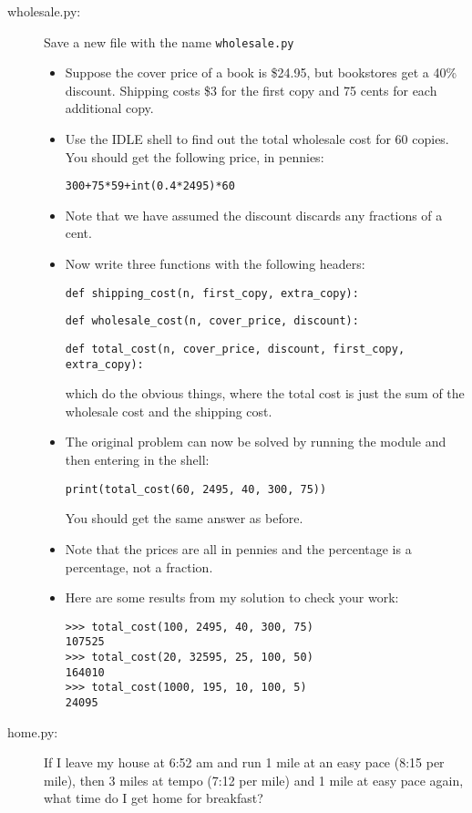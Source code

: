\documentclass[12pt]{article}
\begin{document}
\begin{description}
\item[wholesale.py:] Save a new file with the name \verb|wholesale.py|
\begin{itemize}
\item 
Suppose the cover price of a book is \$24.95, but bookstores get a 40\% discount. Shipping costs \$3 for the first copy and 75 cents for each additional copy.
\item Use the IDLE shell to find out the total wholesale cost for 60 copies.
You should get the following price, in pennies:
\begin{lstlisting}
300+75*59+int(0.4*2495)*60
\end{lstlisting}
\item Note that we have assumed the discount discards
any fractions of a cent.
\item Now write three functions with the following headers:
\begin{lstlisting}
def shipping_cost(n, first_copy, extra_copy):
\end{lstlisting}
\begin{lstlisting}
def wholesale_cost(n, cover_price, discount):
\end{lstlisting}
\begin{lstlisting}
def total_cost(n, cover_price, discount, first_copy, extra_copy):
\end{lstlisting}
which do the obvious things, where the total cost
is just the sum of the wholesale cost and the shipping cost.
\item The original problem can now be solved by running the
module and then entering in the shell:
\begin{lstlisting}
print(total_cost(60, 2495, 40, 300, 75))
\end{lstlisting}
You should get the same answer as before.
\item Note that the prices are all in pennies and the
percentage is a percentage, not a fraction.
\item Here are some results from my solution to check your work:
\begin{lstlisting}
>>> total_cost(100, 2495, 40, 300, 75)
107525
>>> total_cost(20, 32595, 25, 100, 50)
164010
>>> total_cost(1000, 195, 10, 100, 5)
24095
\end{lstlisting}
\end{itemize}

\item[home.py:]
If I leave my house at 6:52 am and run 1 mile at an easy pace (8:15 per mile), then 3 miles at tempo (7:12 per mile) and 1 mile at easy pace again, what time do I get home for breakfast?


\end{description}
\end{document}
